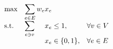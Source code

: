 \documentclass{article}
\begin{document}
	
$$
\begin{array}{ll@{}ll}   %
\text{max}  & \dis\sum\limits_{e\in E} w_{e}&x_{e}        & \\
\text{s.t.} & \dis\sum\limits_{e\ni v}      &x_{e} \le 1, &\forall v\in V \\
            &                                             &x_{e} \in \{0,1\}, &\forall e\in E
\end{array}
$$
	
\end{document}
